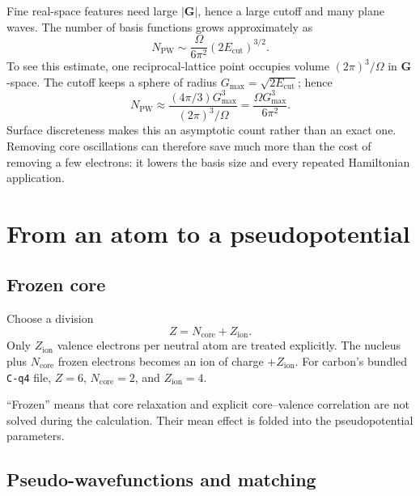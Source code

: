 \documentclass[10pt,twocolumn]{article}
\newcommand{\zion}{Z_{\mathrm{ion}}}
\newcommand{\gvec}{\mathbf G}
\newcommand{\code}[1]{\texttt{#1}}
\begin{document}
Fine real-space features need large \(|\gvec|\), hence a large cutoff and many
plane waves.  The number of basis functions grows approximately as
\begin{equation}
N_{\mathrm{PW}}\sim
\frac{\Omega}{6\pi^2}(2E_{\mathrm{cut}})^{3/2}.
\end{equation}
To see this estimate, one reciprocal-lattice point occupies volume
\((2\pi)^3/\Omega\) in \(\gvec\)-space.  The cutoff keeps a sphere of radius
\(G_{\max}=\sqrt{2E_{\mathrm{cut}}}\); hence
\begin{equation}
N_{\mathrm{PW}}\approx
\frac{(4\pi/3)G_{\max}^3}{(2\pi)^3/\Omega}
=\frac{\Omega G_{\max}^3}{6\pi^2}.
\end{equation}
Surface discreteness makes this an asymptotic count rather than an exact one.
Removing core oscillations can therefore save much more than the cost of
removing a few electrons: it lowers the basis size and every repeated
Hamiltonian application.

\section{From an atom to a pseudopotential}

\subsection{Frozen core}

Choose a division
\begin{equation}
Z= N_{\mathrm{core}}+\zion.
\end{equation}
Only \(\zion\) valence electrons per neutral atom are treated explicitly.
The nucleus plus \(N_{\mathrm{core}}\) frozen electrons becomes an ion of
charge \(+\zion\).  For carbon's bundled \code{C-q4} file,
\(Z=6\), \(N_{\mathrm{core}}=2\), and \(\zion=4\).

``Frozen'' means that core relaxation and explicit core--valence correlation
are not solved during the calculation.  Their mean effect is folded into the
pseudopotential parameters.

\subsection{Pseudo-wavefunctions and matching}
\end{document}
